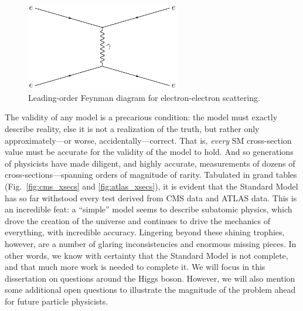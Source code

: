 \begin{figure}[htb]
    \centering
    \includegraphics[width=0.6\textwidth]{fig/feynman/other/ee_scattering.pdf}
    \caption{
        Leading-order Feynman diagram for electron-electron scattering. 
    }
    \label{fig:ee_scattering}
\end{figure}

The validity of any model is a precarious condition: the model must exactly describe reality, else it is not a realization of the truth, but rather only approximately---or worse, accidentally---correct. 
That is, \textit{every} SM cross-section value must be accurate for the validity of the model to hold. 
And so generations of physicists have made diligent, and highly accurate, measurements of dozens of cross-sections---spanning orders of magnitude of rarity. 
Tabulated in grand tables (Fig.~\ref{fig:cms_xsecs} and \ref{fig:atlas_xsecs}), it is evident that the Standard Model has so far withstood every test derived from CMS data and ATLAS data. 
This is an incredible feat: a ``simple'' model seems to describe subatomic physics, which drove the creation of the universe and continues to drive the mechanics of everything, with incredible accuracy. 
Lingering beyond these shining trophies, however, are a number of glaring inconsistencies and enormous missing pieces. 
In other words, we know with certainty that the Standard Model is not complete, and that much more work is needed to complete it. 
We will focus in this dissertation on questions around the Higgs boson. 
However, we will also mention some additional open questions to illustrate the magnitude of the problem ahead for future particle physicists. 


